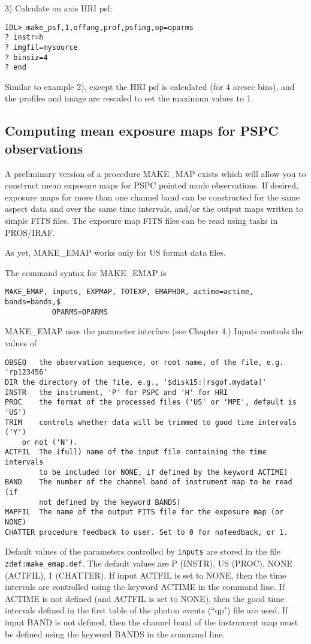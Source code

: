 3) Calculate on axis HRI psf:

\medskip\noindent
\begin{verbatim}
IDL> make_psf,1,offang,prof,psfimg,op=oparms
? instr=h
? imgfil=mysource
? binsiz=4
? end
\end{verbatim}
Similar to example 2), except the HRI psf is calculated (for 4 arcsec bins),
and the profiles and image are rescaled to set the maximum values to 1.
 

\subsection{Computing mean exposure maps for PSPC observations}
 
A preliminary version of a procedure MAKE{\_}MAP exists which will allow you
to construct mean exposure maps for PSPC pointed mode observations. If
desired, exposure maps for more than one channel band can be constructed for
the same aspect data and over the same time intervals, and/or the output maps
written to simple FITS files. The exposure map FITS files can be read using
tasks in PROS/IRAF.
 
As yet, MAKE{\_}EMAP works only for US format data files.
 
The command syntax for MAKE{\_}EMAP is

\medskip\noindent
\begin{verbatim}
MAKE_EMAP, inputs, EXPMAP, TOTEXP, EMAPHDR, actime=actime, bands=bands,$
           OPARMS=OPARMS
\end{verbatim}
MAKE{\_}EMAP uses the parameter interface (see Chapter 4.) Inputs controls the
values of

\medskip\noindent
\begin{verbatim}
OBSEQ	the observation sequence, or root name, of the file, e.g. 'rp123456'
DIR	the directory of the file, e.g., '$disk15:[rsgof.mydata]'
INSTR   the instrument, 'P' for PSPC and 'H' for HRI
PROC    the format of the processed files ('US' or 'MPE', default is 'US')
TRIM	controls whether data will be trimmed to good time intervals ('Y')
	or not ('N').
ACTFIL  The (full) name of the input file containing the time intervals
        to be included (or NONE, if defined by the keyword ACTIME)
BAND    The number of the channel band of instrument map to be read (if
        not defined by the keyword BANDS)
MAPFIL  The name of the output FITS file for the exposure map (or NONE)
CHATTER	procedure feedback to user. Set to 0 for nofeedback, or 1.
\end{verbatim}
Default values of the parameters controlled by {\tt inputs} are stored in the
file {\tt zdef:make{\_}emap.def}. The default values are P (INSTR), US (PROC), NONE
(ACTFIL), 1 (CHATTER). If input ACTFIL is set to NONE, then the time
intervals are controlled using the keyword ACTIME in the command line. If
ACTIME is not defined (and ACTFIL is set to NONE), then the good time
intervals defined in the first table of the photon events (``qp") file are
used. If input BAND is not defined, then the channel band of the instrument
map must be defined using the keyword BANDS in the command line.
 
